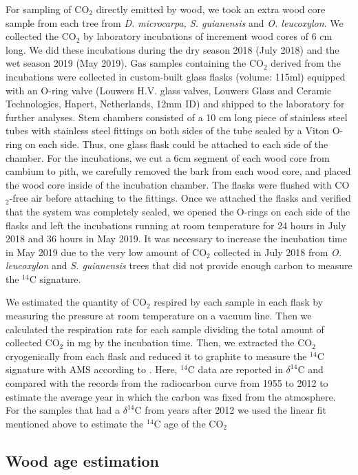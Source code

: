 \documentclass{article}
\begin{document}
For sampling of CO$_{2}$ directly emitted by wood, we took an extra wood core sample from each tree from \textit{D. microcarpa, S. guianensis} and \textit{O. leucoxylon}. We collected the CO$_{2}$ by laboratory incubations of increment wood cores of 6 cm long. We did these incubations during the dry season 2018 (July 2018) and the wet season 2019 (May 2019). Gas samples containing the CO$_{2}$ derived from the incubations were collected in custom-built glass flasks (volume: 115ml) equipped with an O-ring valve (Louwers H.V. glass valves, Louwers Glass and Ceramic Technologies, Hapert, Netherlands, 12mm ID) and shipped to the laboratory for further analyses. Stem chambers consisted of a 10 cm long piece of stainless steel tubes with stainless steel fittings on both sides of the tube sealed by a Viton O-ring on each side. Thus, one glass flask could be attached to each side of the chamber. For the incubations, we cut a 6cm segment of each wood core from cambium to pith, we carefully removed the bark from each wood core, and placed the wood core inside of the incubation chamber. The flasks were flushed with CO$_{2}$-free air before attaching to the fittings. Once we attached the flasks and verified that the system was completely sealed, we opened the O-rings on each side of the flasks and left the incubations running at room temperature for 24 hours in July 2018 and 36 hours in May 2019. It was necessary to increase the incubation time in May 2019 due to the very low amount of CO$_{2}$ collected in July 2018 from \textit{O. leucoxylon} and \textit{S. guianensis} trees that did not provide enough carbon to measure the $^{14}$C signature.

We estimated the quantity of CO$_{2}$ respired by each sample in each flask by measuring the pressure at room temperature on a vacuum line. Then we calculated the respiration rate for each sample dividing the total amount of collected CO$_{2}$ in mg by the incubation time. Then, we extracted the CO$_{2}$ cryogenically from each flask and reduced it to graphite to measure the $^{14}$C signature with AMS according to \citet{steinhof:2017}. Here, $^{14}$C data are reported in $\delta^{14}$C and compared with the records from the radiocarbon curve from 1955 to 2012  \citep{hua:2013} to estimate the average year in which the carbon was fixed from the atmosphere. For the samples that had a $\delta^{14}$C from years after 2012 we used the linear fit mentioned above to estimate the $^{14}$C age of the CO$_{2}$


\subsection{Wood age estimation}
\end{document}
